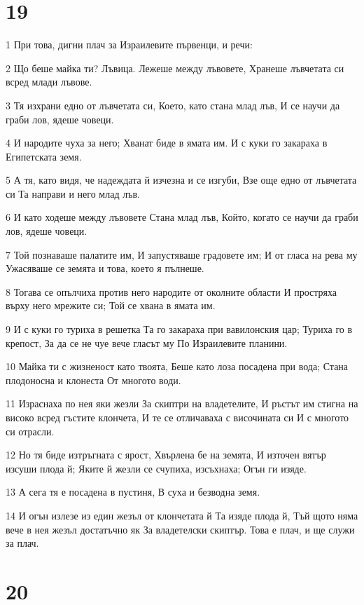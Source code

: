 \chapter{19}

\par 1 При това, дигни плач за Израилевите първенци, и речи:
\par 2 Що беше майка ти? Лъвица. Лежеше между лъвовете, Хранеше лъвчетата си всред млади лъвове.
\par 3 Тя изхрани едно от лъвчетата си, Което, като стана млад лъв, И се научи да граби лов, ядеше човеци.
\par 4 И народите чуха за него; Хванат биде в ямата им. И с куки го закараха в Египетската земя.
\par 5 А тя, като видя, че надеждата й изчезна и се изгуби, Взе още едно от лъвчетата си Та направи и него млад лъв.
\par 6 И като ходеше между лъвовете Стана млад лъв, Който, когато се научи да граби лов, ядеше човеци.
\par 7 Той познаваше палатите им, И запустяваше градовете им; И от гласа на рева му Ужасяваше се земята и това, което я пълнеше.
\par 8 Тогава се опълчиха против него народите от околните области И простряха върху него мрежите си; Той се хвана в ямата им.
\par 9 И с куки го туриха в решетка Та го закараха при вавилонския цар; Туриха го в крепост, За да се не чуе вече гласът му По Израилевите планини.
\par 10 Майка ти с жизненост като твоята, Беше като лоза посадена при вода; Стана плодоносна и клонеста От многото води.
\par 11 Израснаха по нея яки жезли За скиптри на владетелите, И ръстът им стигна на високо всред гъстите клончета, И те се отличаваха с височината си И с многото си отрасли.
\par 12 Но тя биде изтръгната с ярост, Хвърлена бе на земята, И източен вятър изсуши плода й; Яките й жезли се счупиха, изсъхнаха; Огън ги изяде.
\par 13 А сега тя е посадена в пустиня, В суха и безводна земя.
\par 14 И огън излезе из един жезъл от клончетата й Та изяде плода й, Тъй щото няма вече в нея жезъл достатъчно як За владетелски скиптър. Това е плач, и ще служи за плач.

\chapter{20}

